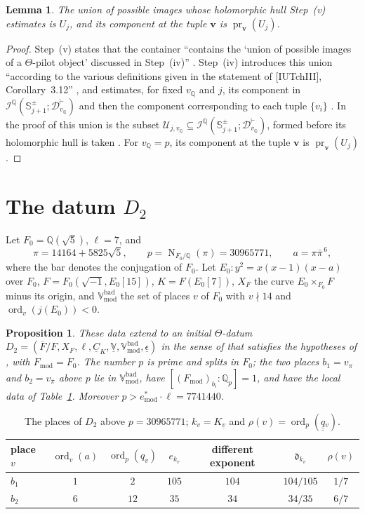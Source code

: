 \documentclass[11pt]{amsart}
\newtheorem{proposition}[theorem]{Proposition}
\newtheorem{lemma}[theorem]{Lemma}
\theoremstyle{remark}
\newcommand{\Q}{\mathbb Q}
\newcommand{\Qp}{\mathbb Q_p}
\newcommand{\cI}{\mathcal I}
\newcommand{\cU}{\mathcal U}
\newcommand{\dd}{\mathfrak d}
\newcommand{\qq}{\underline{\underline{q}}{}}
\newcommand{\Fmod}{F_{\mathrm{mod}}}
\newcommand{\VV}{\underline{\mathbb V}}
\newcommand{\Vbadmod}{\mathbb V^{\mathrm{bad}}_{\mathrm{mod}}}
\newcommand{\pr}{\operatorname{pr}}
\newcommand{\Nm}{\operatorname{N}}
\newcommand{\Sj}{\mathbb S^{\pm}_{j+1}}
\newcommand{\bv}{\mathbf v}
\begin{document}
\begin{lemma}\label{l:object}
The union of possible images whose holomorphic hull Step~(v) estimates is $U_j$, and its component at the
tuple $\bv$ is $\pr_{\bv}(U_j)$.
\end{lemma}

\begin{proof}
Step~(v) states that the container ``contains the `union of possible images of a $\Theta$-pilot object'
discussed in Step~(iv)'' \cite[p.~27]{IUT4}. Step~(iv) introduces this union ``according to the various
definitions given in the statement of [IUTchIII], Corollary~3.12'' \cite[p.~26]{IUT4}, and estimates, for fixed
$v_{\Q}$ and $j$, its component in $\cI^{\Q}(\Sj;\mathcal D^{\vdash}_{v_{\Q}})$ and then the component
corresponding to each tuple $\{v_i\}$ \cite[p.~27]{IUT4}. In the proof of \cite[Cor.~3.12]{IUT3} this union is the
subset $\cU_{j,v_{\Q}}\subseteq\cI^{\Q}(\Sj;\mathcal D^{\vdash}_{v_{\Q}})$, formed before its holomorphic hull is
taken \cite[p.~174]{IUT3}. For $v_{\Q}=p$, its component at the tuple $\bv$ is $\pr_{\bv}(U_j)$.
\end{proof}

\section{The datum \texorpdfstring{$D_2$}{D2}}\label{s:datum}

Let $F_0=\Q(\sqrt5)$, $\ell=7$, and
\[
\pi=14164+5825\sqrt5,\qquad p=\Nm_{F_0/\Q}(\pi)=30965771,\qquad a=\pi\bar\pi^{\,6},
\]
where the bar denotes the conjugation of $F_0$. Let $E_0\colon y^2=x(x-1)(x-a)$ over $F_0$,
$F=F_0(\sqrt{-1},E_0[15])$, $K=F(E_0[7])$, $X_F$ the curve $E_0\times_{F_0}F$ minus its origin, and $\Vbadmod$ the
set of places $v$ of $F_0$ with $v\nmid 14$ and $\operatorname{ord}_v(j(E_0))<0$.

\begin{proposition}\label{p:datum}
These data extend to an initial $\Theta$-datum
$D_2=(\overline F/F,X_F,\ell,\underline C_K,\VV,\Vbadmod,\underline\epsilon)$ in the sense of
\cite[Def.~3.1]{IUT1} that satisfies the hypotheses of \cite[Thm.~1.10]{IUT4}, with $\Fmod=F_0$. The number $p$ is
prime and splits in $F_0$; the two places $b_1=v_\pi$ and $b_2=v_{\bar\pi}$ above $p$ lie in $\Vbadmod$, have
$[(\Fmod)_{b_i}:\Qp]=1$, and have the local data of Table~\ref{tab:D2}. Moreover
$p>e^*_{\mathrm{mod}}\cdot\ell=7741440$.
\end{proposition}

\begin{table}[ht]
\centering
\begin{tabular}{@{}lcccccc@{}}
\toprule
place $v$ & $\operatorname{ord}_v(a)$ & $\operatorname{ord}_p(q_v)$ & $e_{k_v}$ & different exponent & $\dd_{k_v}$
  & $\rho(v)$\\
\midrule
$b_1$ & $1$ & $2$ & $105$ & $104$ & $104/105$ & $1/7$\\
$b_2$ & $6$ & $12$ & $35$ & $34$ & $34/35$ & $6/7$\\
\bottomrule
\end{tabular}
\caption{The places of $D_2$ above $p=30965771$; $k_v=K_{\underline v}$ and $\rho(v)=\operatorname{ord}_p(\qq_v)$.}\label{tab:D2}
\end{table}
\end{document}
